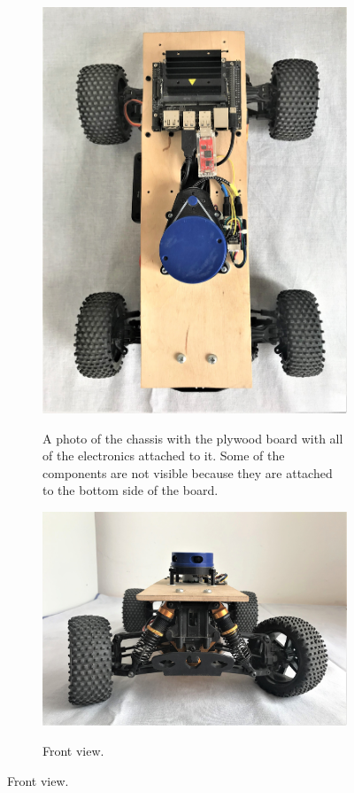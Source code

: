 \begin{figure}[!tbp]
\begin{subfigure}[t]{0.45\textwidth}
		\includegraphics[width=\textwidth]{../img/car_top}
		\label{fig:chassis_with_electronics}
		\caption{A photo of the chassis with the plywood board with all of the electronics attached to it. Some of the components are not visible  because they are attached to the bottom side of the board.}
	\end{subfigure}

	\vspace{1cm}

	\begin{subfigure}[b]{0.7\textwidth}		
		\includegraphics[width=\textwidth]{../img/car_front}
		\label{fig:chassis_front_view}
		\caption{Front view.}
	\end{subfigure}
	

\end{figure}
